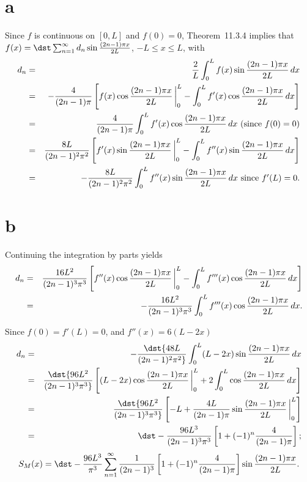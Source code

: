 \documentclass[dvips]{book}
\renewcommand{\exer}[1]{\par\medskip\;\noindent{\color{red}\bf #1.}}
\numberwithin{example}{section}
\numberwithin{equation}{section}
\numberwithin{theorem}{section}
\numberwithin{table}{section}
\numberwithin{figure}{section}
\newcommand{\lims}[2]{\,\bigg|_{#1}^{#2}}
\begin{document}
\exer{11.3.50}
\part{a}
Since $f$ is continuous on $[0,L]$ and $f(0)=0$,
Theorem~11.3.4 implies that\\
$f(x)=\dst\sum_{n=1}^\infty d_n\sin{(2n-1)\pi x\over2L}$, $-L\le
x\le L$,  with
\begin{eqnarray*}
d_n&=&{2\over L}\int_0^Lf(x)\sin{(2n-1)\pi x\over2L}\,dx\\
&=&-{4\over(2n-1)\pi}\left[f(x)\cos{(2n-1)\pi x\over2L}\lims0L
-\int_0^Lf'(x)\cos{(2n-1)\pi x\over2L}\,dx\right]\\
&=&{4\over(2n-1)\pi}\int_0^Lf'(x)\cos{(2n-1)\pi x\over2L}\,dx
\mbox{ (since $f(0)=0$)}\\
&=&{8L\over(2n-1)^2\pi^2}\left[f'(x)\sin{(2n-1)\pi x\over2L}\lims0L
-\int_0^Lf''(x)\sin{(2n-1)\pi x\over2L}\,dx\right]\\
&=&-{8L\over(2n-1)^2\pi^2}\int_0^Lf''(x)\sin{(2n-1)\pi x\over2L}\,dx
\mbox{ since $f'(L)=0$}.
\end{eqnarray*}

\part{b}  Continuing the integration by parts yields
\begin{eqnarray*}
d_n&=&{16L^2\over(2n-1)^3\pi^3}\left[f''(x)\cos{(2n-1)\pi
x\over2L}\lims0L-\int_0^Lf'''(x)\cos{(2n-1)\pi x\over2L}\,dx\right]\\
&=&-{16L^2\over(2n-1)^3\pi^3}
\int_0^Lf'''(x)\cos{(2n-1)\pi x\over2L}\,dx.
\end{eqnarray*}


\exer{11.3.52}
Since $f(0)=f'(L)=0$, and $f''(x)=6(L-2x)$
\begin{eqnarray*}
d_n&=&-\dst{48L\over(2n-1)^2\pi^2}\int_0^L(L-2x)
\sin{(2n-1)\pi x\over2L}\,dx\\
&=&\dst{96L^2\over(2n-1)^3\pi^3}\left[(L-2x)\cos{(2n-1)\pi
x\over2L}\lims0L+2\int_0^L\cos{(2n-1)\pi x\over2L}\,dx\right]\\
&=&\dst{96L^2\over(2n-1)^3\pi^3}\left[-L+{4L\over(2n-1)\pi}
\sin{(2n-1)\pi x\over2L}\lims0L\right]\\
&=&\dst-{96L^3\over(2n-1)^3\pi^3}\left[1+(-1)^n{4\over(2n-1)\pi}\right];
\end{eqnarray*}
$$
S_M(x)
=\dst-{96L^3\over\pi^3}\sum_{n=1}^\infty
{1\over(2n-1)^3}\left[1+(-1)^n{4\over(2n-1)\pi}\right]\sin{(2n-1)\pi x
\over2L}.
$$
\end{document}
